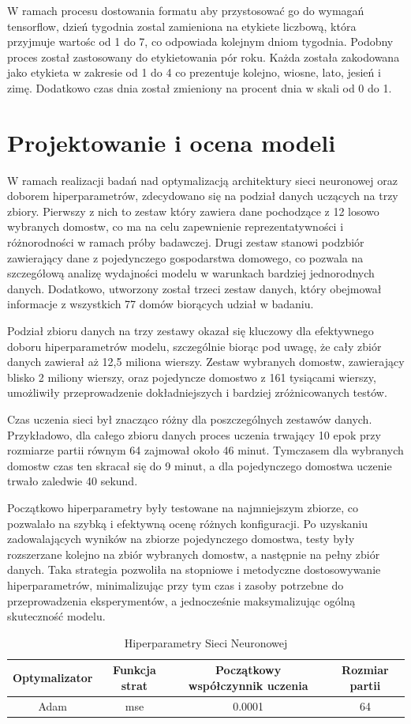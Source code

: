 \documentclass[a4paper,twoside,12pt]{book}
\begin{document}
W ramach procesu dostowania formatu aby przystosować go do wymagań tensorflow, dzień tygodnia zostal zamieniona na etykiete liczbową, która przyjmuje wartośc od 1 do 7, co odpowiada kolejnym dniom tygodnia. Podobny proces został zastosowany do etykietowania pór roku. Każda została zakodowana jako etykieta w zakresie od 1 do 4 co prezentuje kolejno, wiosne, lato, jesień i zimę. Dodatkowo czas dnia został zmieniony na procent dnia w skali od 0 do 1.
\section{Projektowanie i ocena modeli}
W ramach realizacji badań nad optymalizacją architektury sieci neuronowej oraz doborem hiperparametrów, zdecydowano się na podział danych uczących na trzy zbiory. Pierwszy z nich to zestaw który zawiera dane pochodzące z 12 losowo wybranych domostw, co ma na celu zapewnienie reprezentatywności i różnorodności w ramach próby badawczej. Drugi zestaw stanowi podzbiór zawierający dane z pojedynczego gospodarstwa domowego, co pozwala na szczegółową analizę wydajności modelu w warunkach bardziej jednorodnych danych. Dodatkowo, utworzony został trzeci zestaw danych, który obejmował informacje z wszystkich 77 domów biorących udział w badaniu.


Podział zbioru danych na trzy zestawy okazał się kluczowy dla efektywnego doboru hiperparametrów modelu, szczególnie biorąc pod uwagę, że cały zbiór danych zawierał aż 12,5 miliona wierszy. Zestaw wybranych domostw, zawierający blisko 2 miliony wierszy, oraz pojedyncze domostwo z 161 tysiącami wierszy, umożliwiły przeprowadzenie dokładniejszych i bardziej zróżnicowanych testów.

Czas uczenia sieci był znacząco różny dla poszczególnych zestawów danych. Przykładowo, dla całego zbioru danych proces uczenia trwający 10 epok przy rozmiarze partii równym 64 zajmował około 46 minut. Tymczasem dla wybranych domostw czas ten skracał się do 9 minut, a dla pojedynczego domostwa uczenie trwało zaledwie 40 sekund.

Początkowo hiperparametry były testowane na najmniejszym zbiorze, co pozwalało na szybką i efektywną ocenę różnych konfiguracji. Po uzyskaniu zadowalających wyników na zbiorze pojedynczego domostwa, testy były rozszerzane kolejno na zbiór wybranych domostw, a następnie na pełny zbiór danych. Taka strategia pozwoliła na stopniowe i metodyczne dostosowywanie hiperparametrów, minimalizując przy tym czas i zasoby potrzebne do przeprowadzenia eksperymentów, a jednocześnie maksymalizując ogólną skuteczność modelu.
\begin{table}[!h]
	\centering
	\caption{Hiperparametry Sieci Neuronowej}
	\begin{tabular}{|c|c|c|c|}
		\hline
		Optymalizator & Funkcja strat & Początkowy współczynnik uczenia & Rozmiar partii \\ \hline
		Adam          & mse           & 0.0001                          & 64             \\ \hline
	\end{tabular}
\end{table}
\end{document}

